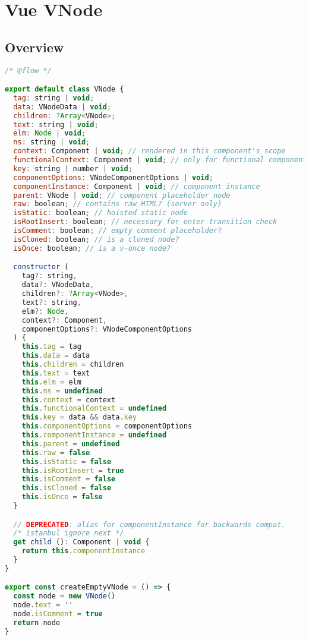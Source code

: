 \part{Vue VNode}

\chapter{Overview}







\begin{lstlisting}[language=JavaScript]
/* @flow */

export default class VNode {
  tag: string | void;
  data: VNodeData | void;
  children: ?Array<VNode>;
  text: string | void;
  elm: Node | void;
  ns: string | void;
  context: Component | void; // rendered in this component's scope
  functionalContext: Component | void; // only for functional component root nodes
  key: string | number | void;
  componentOptions: VNodeComponentOptions | void;
  componentInstance: Component | void; // component instance
  parent: VNode | void; // component placeholder node
  raw: boolean; // contains raw HTML? (server only)
  isStatic: boolean; // hoisted static node
  isRootInsert: boolean; // necessary for enter transition check
  isComment: boolean; // empty comment placeholder?
  isCloned: boolean; // is a cloned node?
  isOnce: boolean; // is a v-once node?

  constructor (
    tag?: string,
    data?: VNodeData,
    children?: ?Array<VNode>,
    text?: string,
    elm?: Node,
    context?: Component,
    componentOptions?: VNodeComponentOptions
  ) {
    this.tag = tag
    this.data = data
    this.children = children
    this.text = text
    this.elm = elm
    this.ns = undefined
    this.context = context
    this.functionalContext = undefined
    this.key = data && data.key
    this.componentOptions = componentOptions
    this.componentInstance = undefined
    this.parent = undefined
    this.raw = false
    this.isStatic = false
    this.isRootInsert = true
    this.isComment = false
    this.isCloned = false
    this.isOnce = false
  }

  // DEPRECATED: alias for componentInstance for backwards compat.
  /* istanbul ignore next */
  get child (): Component | void {
    return this.componentInstance
  }
}

export const createEmptyVNode = () => {
  const node = new VNode()
  node.text = ''
  node.isComment = true
  return node
}


\end{lstlisting}
